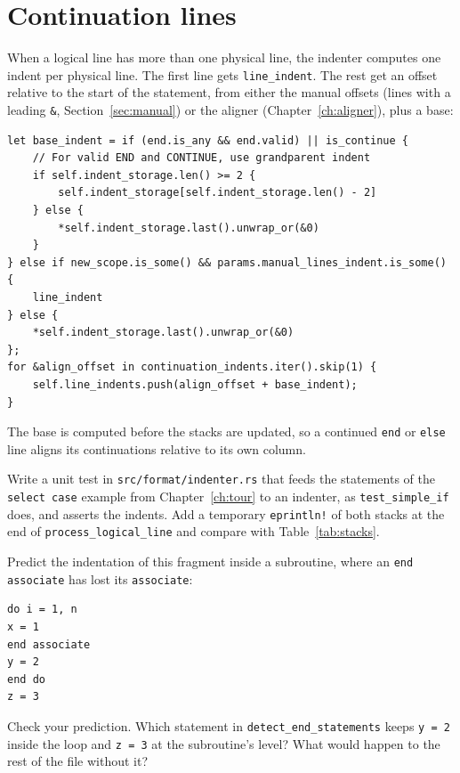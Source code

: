 \documentclass[11pt,a4paper,openany]{book}
\newcommand{\code}[1]{\texttt{\small #1}}
\newcommand{\file}[1]{\texttt{\small\color{accent}#1}}
\newcounter{exercise}[chapter]
\begin{document}
\section{Continuation lines}

When a logical line has more than one physical line, the indenter computes one
indent per physical line. The first line gets \code{line\_indent}. The rest get
an offset relative to the start of the statement, from either the manual
offsets (lines with a leading \code{\&}, Section~\ref{sec:manual}) or the
aligner (Chapter~\ref{ch:aligner}), plus a base:

\begin{lstlisting}[style=rust]
let base_indent = if (end.is_any && end.valid) || is_continue {
    // For valid END and CONTINUE, use grandparent indent
    if self.indent_storage.len() >= 2 {
        self.indent_storage[self.indent_storage.len() - 2]
    } else {
        *self.indent_storage.last().unwrap_or(&0)
    }
} else if new_scope.is_some() && params.manual_lines_indent.is_some() {
    line_indent
} else {
    *self.indent_storage.last().unwrap_or(&0)
};
for &align_offset in continuation_indents.iter().skip(1) {
    self.line_indents.push(align_offset + base_indent);
}
\end{lstlisting}

The base is computed before the stacks are updated, so a continued
\code{end} or \code{else} line aligns its continuations relative to its own
column.

\begin{exercise}
Write a unit test in \file{src/format/indenter.rs} that feeds the statements of
the \code{select case} example from Chapter~\ref{ch:tour} to an indenter, as
\code{test\_simple\_if} does, and asserts the indents. Add a temporary
\code{eprintln!} of both stacks at the end of \code{process\_logical\_line}
and compare with Table~\ref{tab:stacks}.
\end{exercise}

\begin{exercise}
Predict the indentation of this fragment inside a subroutine, where an
\code{end associate} has lost its \code{associate}:
\begin{lstlisting}[style=fortran]
do i = 1, n
x = 1
end associate
y = 2
end do
z = 3
\end{lstlisting}
Check your prediction. Which statement in \code{detect\_end\_statements} keeps
\code{y = 2} inside the loop and \code{z = 3} at the subroutine's level? What
would happen to the rest of the file without it?
\end{exercise}
\end{document}
